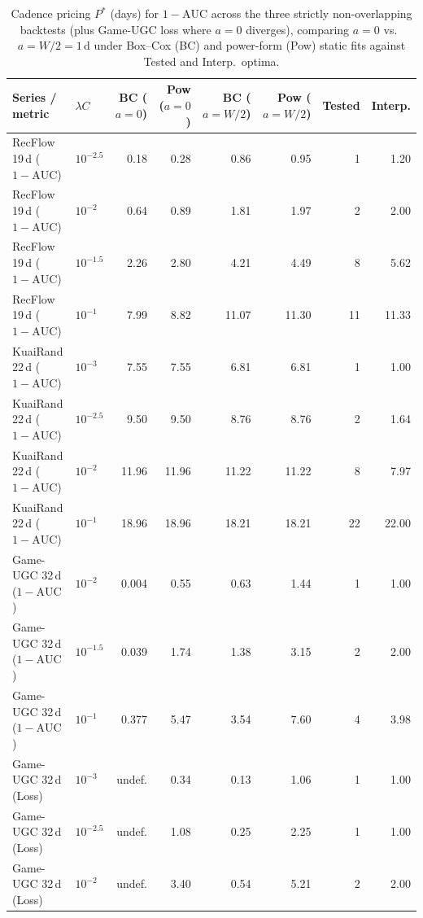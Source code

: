 \documentclass[10pt,letterpaper]{article}
\begin{document}
\begin{table}[t]
\centering
\caption{Cadence pricing $P^\ast$ (days) for $1{-}\mathrm{AUC}$ across the
three strictly non-overlapping backtests (plus Game-UGC loss where $a{=}0$
diverges), comparing $a{=}0$ vs.\ $a{=}W/2{=}1$\,d under Box--Cox (BC) and
power-form (Pow) static fits against Tested and Interp.\ optima.}
\label{tab:pstar_auc_s9}
\scriptsize
\setlength{\tabcolsep}{3.5pt}
\begin{tabular}{llrrrrrr}
\toprule
Series / metric & $\lambda C$ & BC ($a{=}0$) & Pow ($a{=}0$) & BC ($a{=}W/2$) & Pow ($a{=}W/2$) & Tested & Interp. \\
\midrule
RecFlow 19\,d ($1{-}\mathrm{AUC}$) & $10^{-2.5}$ & 0.18 & 0.28 & 0.86 & 0.95 & 1 & 1.20 \\
RecFlow 19\,d ($1{-}\mathrm{AUC}$) & $10^{-2}$   & 0.64 & 0.89 & 1.81 & 1.97 & 2 & 2.00 \\
RecFlow 19\,d ($1{-}\mathrm{AUC}$) & $10^{-1.5}$ & 2.26 & 2.80 & 4.21 & 4.49 & 8 & 5.62 \\
RecFlow 19\,d ($1{-}\mathrm{AUC}$) & $10^{-1}$   & 7.99 & 8.82 & 11.07 & 11.30 & 11 & 11.33 \\
\midrule
KuaiRand 22\,d ($1{-}\mathrm{AUC}$) & $10^{-3}$  & 7.55 & 7.55 & 6.81 & 6.81 & 1 & 1.00 \\
KuaiRand 22\,d ($1{-}\mathrm{AUC}$) & $10^{-2.5}$ & 9.50 & 9.50 & 8.76 & 8.76 & 2 & 1.64 \\
KuaiRand 22\,d ($1{-}\mathrm{AUC}$) & $10^{-2}$  & 11.96 & 11.96 & 11.22 & 11.22 & 8 & 7.97 \\
KuaiRand 22\,d ($1{-}\mathrm{AUC}$) & $10^{-1}$  & 18.96 & 18.96 & 18.21 & 18.21 & 22 & 22.00 \\
\midrule
Game-UGC 32\,d ($1{-}\mathrm{AUC}$) & $10^{-2}$  & 0.004 & 0.55 & 0.63 & 1.44 & 1 & 1.00 \\
Game-UGC 32\,d ($1{-}\mathrm{AUC}$) & $10^{-1.5}$ & 0.039 & 1.74 & 1.38 & 3.15 & 2 & 2.00 \\
Game-UGC 32\,d ($1{-}\mathrm{AUC}$) & $10^{-1}$  & 0.377 & 5.47 & 3.54 & 7.60 & 4 & 3.98 \\
\midrule
Game-UGC 32\,d (Loss) & $10^{-3}$   & undef. & 0.34 & 0.13 & 1.06 & 1 & 1.00 \\
Game-UGC 32\,d (Loss) & $10^{-2.5}$ & undef. & 1.08 & 0.25 & 2.25 & 1 & 1.00 \\
Game-UGC 32\,d (Loss) & $10^{-2}$   & undef. & 3.40 & 0.54 & 5.21 & 2 & 2.00 \\
\bottomrule
\end{tabular}
\end{table}
\end{document}
